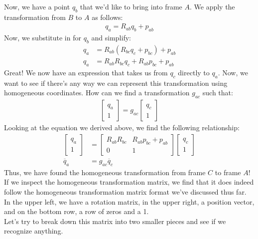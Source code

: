 \documentclass[oneside]{book}
\begin{document}
Now, we have a point $q_b$ that we'd like to bring into frame $A$. We apply the transformation from $B$ to $A$ as follows:
\begin{align}
    q_a = R_{ab}q_b + p_{ab}
\end{align}
Now, we substitute in for $q_b$ and simplify:
\begin{align}
    q_a &= R_{ab}(R_{bc}q_c + p_{bc}) + p_{ab}\\
    q_a &= R_{ab}R_{bc}q_c + R_{ab}p_{bc} + p_{ab}
\end{align}
Great! We now have an expression that takes us from $q_c$ directly to $q_a$. Now, we want to see if there's any way we can represent this transformation using homogeneous coordinates. How can we find a transformation $g_{ac}$ such that:
\begin{align}
    \begin{bmatrix}
    q_a\\
    1
    \end{bmatrix}
    = g_{ac}
    \begin{bmatrix}
    q_c\\
    1
    \end{bmatrix}
\end{align}
Looking at the equation we derived above, we find the following relationship:
\begin{align}
    \begin{bmatrix}
    q_a\\
    1
    \end{bmatrix}
    &= 
    \begin{bmatrix}
    R_{ab}R_{bc} & R_{ab}p_{bc} + p_{ab}\\
    0 & 1
    \end{bmatrix}
    \begin{bmatrix}
    q_c\\
    1
    \end{bmatrix}\\
    \overline{q}_a &= g_{ac}\overline{q}_c
\end{align}
Thus, we have found the homogeneous transformation from frame $C$ to frame $A$! If we inspect the homogeneous transformation matrix, we find that it does indeed follow the homogeneous transformation matrix format we've discussed thus far. In the upper left, we have a rotation matrix, in the upper right, a position vector, and on the bottom row, a row of zeros and a 1.\\
Let's try to break down this matrix into two smaller pieces and see if we recognize anything.
\end{document}
